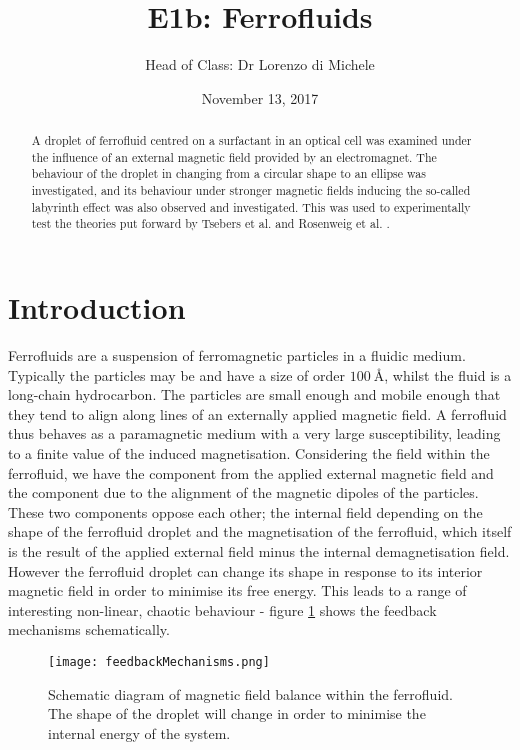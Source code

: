 \documentclass[12pt]{article}
\title{E1b: Ferrofluids}
\author{Head of Class: Dr Lorenzo di Michele}
\date{November 13, 2017}
\begin{document}
\maketitle

\begin{abstract}
A droplet of ferrofluid centred on a surfactant in an optical cell was examined under the influence of an external magnetic field provided by an electromagnet. The behaviour of the droplet in changing from a circular shape to an ellipse was investigated, and its behaviour under stronger magnetic fields inducing the so-called labyrinth effect was also observed and investigated. This was used to experimentally test the theories put forward by Tsebers et al. \cite{ref4} and Rosenweig et al. \cite{ref3}.
\end{abstract}

\section{Introduction}
Ferrofluids are a suspension of ferromagnetic particles in a fluidic medium. Typically the particles may be  and have a size of order $\SI{100}{\angstrom}$, whilst the fluid is a long-chain hydrocarbon. The particles are small enough and mobile enough that they tend to align along lines of an externally applied magnetic field. A ferrofluid thus behaves as a paramagnetic medium with a very large susceptibility, leading to a finite value of the induced magnetisation. Considering the field within the ferrofluid, we have the component from the applied external magnetic field and the component due to the alignment of the magnetic dipoles of the particles. These two components oppose each other; the internal field depending on the shape of the ferrofluid droplet and the magnetisation of the ferrofluid, which itself is the result of the applied external field minus the internal demagnetisation field. However the ferrofluid droplet can change its shape in response to its interior magnetic field in order to minimise its free energy. This leads to a range of interesting non-linear, chaotic behaviour - figure \ref{feedbackMechanisms} shows the feedback mechanisms schematically.
\begin{figure}[H]
\centering
\texttt{[image: feedbackMechanisms.png]}
\caption{Schematic diagram of magnetic field balance within the ferrofluid. The shape of the droplet will change in order to minimise the internal energy of the system.}
\label{feedbackMechanisms}
\end{figure}
\end{document}
